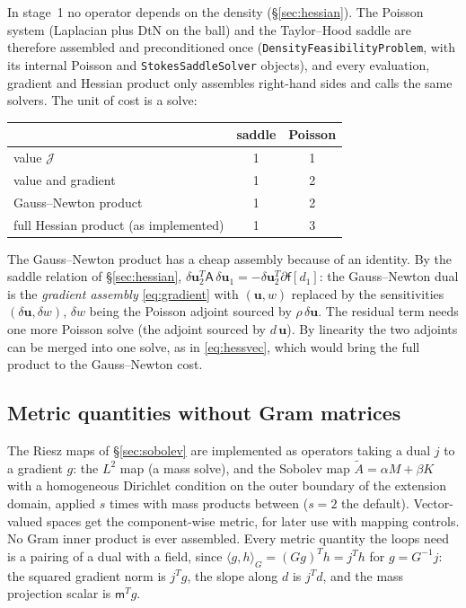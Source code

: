 \documentclass[11pt]{article}
\newcommand{\Jf}{\mathscr{J}}  %
\newcommand{\bu}{\mathbf{u}}
\newcommand{\ip}[2]{\langle #1, #2\rangle}
\begin{document}
In stage~1 no operator depends on the density (\S\ref{sec:hessian}). The
Poisson system (Laplacian plus DtN on the ball) and the Taylor--Hood
saddle are therefore assembled and preconditioned once
(\texttt{DensityFeasibilityProblem}, with its internal Poisson and
\texttt{StokesSaddleSolver} objects), and every evaluation, gradient and
Hessian product only assembles right-hand sides and calls the same
solvers. The unit of cost is a solve:
\begin{center}
\begin{tabular}{l c c}
  & saddle & Poisson \\ \hline
  value $\Jf $ & 1 & 1 \\
  value and gradient & 1 & 2 \\
  Gauss--Newton product & 1 & 2 \\
  full Hessian product (as implemented) & 1 & 3
\end{tabular}
\end{center}
The Gauss--Newton product has a cheap assembly because of an identity.
By the saddle relation of \S\ref{sec:hessian},
$\delta\bu_2^{T}\mathsf{A}\,\delta\bu_1 = -\delta\bu_2^{T}\partial
\mathsf{f}[d_1]$: the Gauss--Newton dual is the \emph{gradient assembly}
\eqref{eq:gradient} with $(\bu, w)$ replaced by the sensitivities
$(\delta\bu, \delta w)$, $\delta w$ being the Poisson adjoint sourced by
$\rho\,\delta\bu$. The residual term needs one more Poisson solve (the
adjoint sourced by $d\,\bu$). By linearity the two adjoints can be merged
into one solve, as in \eqref{eq:hessvec}, which would bring the full
product to the Gauss--Newton cost.

\subsection{Metric quantities without Gram matrices}

The Riesz maps of \S\ref{sec:sobolev} are implemented as operators taking
a dual $j$ to a gradient $g$: the $L^2$ map (a mass solve), and the
Sobolev map $\tilde A = \alpha M + \beta K$ with a homogeneous Dirichlet
condition on the outer boundary of the extension domain, applied $s$
times with mass products between ($s = 2$ the default). Vector-valued
spaces get the component-wise metric, for later use with mapping
controls. No Gram inner product is ever assembled. Every metric quantity
the loops need is a pairing of a dual with a field, since
$\ip{g}{h}_G = (Gg)^{T}h = j^{T}h$ for $g = G^{-1}j$: the squared gradient
norm is $j^{T}g$, the slope along $d$ is $j^{T}d$, and the mass
projection scalar is $\mathsf{m}^{T}g$.
\end{document}
